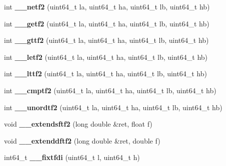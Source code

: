 \begin{DoxyCompactItemize}
int {\bfseries \+\_\+\+\_\+netf2} (uint64\+\_\+t la, uint64\+\_\+t ha, uint64\+\_\+t lb, uint64\+\_\+t hb)
\item 
\mbox{\label{group__compiler_gaa4067976976ddf6189ff05068f071421}} 
int {\bfseries \+\_\+\+\_\+getf2} (uint64\+\_\+t la, uint64\+\_\+t ha, uint64\+\_\+t lb, uint64\+\_\+t hb)
\item 
\mbox{\label{group__compiler_ga22ea3ec1bb3c252037a6d1de080f59ec}} 
int {\bfseries \+\_\+\+\_\+gttf2} (uint64\+\_\+t la, uint64\+\_\+t ha, uint64\+\_\+t lb, uint64\+\_\+t hb)
\item 
\mbox{\label{group__compiler_ga1c52620ce5caeab3f24d20848de48020}} 
int {\bfseries \+\_\+\+\_\+letf2} (uint64\+\_\+t la, uint64\+\_\+t ha, uint64\+\_\+t lb, uint64\+\_\+t hb)
\item 
\mbox{\label{group__compiler_ga31e5201b17ecf49bf0544d619b3a211e}} 
int {\bfseries \+\_\+\+\_\+lttf2} (uint64\+\_\+t la, uint64\+\_\+t ha, uint64\+\_\+t lb, uint64\+\_\+t hb)
\item 
\mbox{\label{group__compiler_ga130b5f6598f3db086bc0767c6be028c0}} 
int {\bfseries \+\_\+\+\_\+cmptf2} (uint64\+\_\+t la, uint64\+\_\+t ha, uint64\+\_\+t lb, uint64\+\_\+t hb)
\item 
\mbox{\label{group__compiler_ga26cb1a82545578282008ab4dc67cf262}} 
int {\bfseries \+\_\+\+\_\+unordtf2} (uint64\+\_\+t la, uint64\+\_\+t ha, uint64\+\_\+t lb, uint64\+\_\+t hb)
\item 
\mbox{\label{group__compiler_ga3feafc107fc44ac8039a667ee49bcdbf}} 
void {\bfseries \+\_\+\+\_\+extendsftf2} (long double \&ret, float f)
\item 
\mbox{\label{group__compiler_gae76415cbe79dbac141141a706158552c}} 
void {\bfseries \+\_\+\+\_\+extenddftf2} (long double \&ret, double f)
\item 
\mbox{\label{group__compiler_gafb30709e77efa4ef9eb3bf4d42004ecf}} 
int64\+\_\+t {\bfseries \+\_\+\+\_\+fixtfdi} (uint64\+\_\+t l, uint64\+\_\+t h)
\item 

\end{DoxyCompactItemize}
